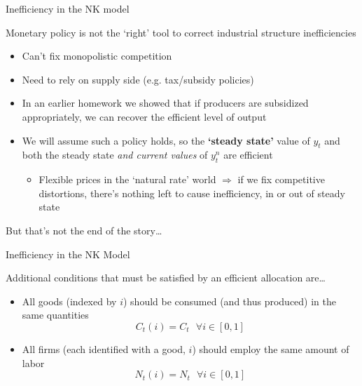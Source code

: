 \begin{frame}[label=efficiency]{Inefficiency in the NK model}

Monetary policy is not the `right' tool to correct industrial structure inefficiencies
\begin{itemize}
\item	Can't fix monopolistic competition
\item	Need to rely on supply side (e.g. tax/subsidy policies)
\item	In an earlier homework we showed that if producers are subsidized appropriately, we can recover the efficient level of output \hyperlink{efficiency_escape}{}
\item	We will assume such a policy holds, so the \textbf{`steady state'} value of $y_{t}$ and both the steady state \textit{and current values} of $y^{n}_{t}$ are efficient
	\begin{itemize}
	\item	Flexible prices in the `natural rate' world $\Rightarrow$ if we fix competitive distortions, there's nothing left to cause inefficiency, in or out of steady state
	\end{itemize}
\end{itemize}

\vspace{2mm}
But that's not the end of the story\ldots

\end{frame}


	
\begin{frame}{Inefficiency in the NK Model}

Additional conditions that must be satisfied by an efficient allocation are\ldots

\vspace{2mm}
\begin{itemize}
\item	All goods (indexed by $i$) should be consumed (and thus produced) in the same quantities
\[
C_{t}(i) = C_{t}\text{  } \forall i \in [0,1]
\]

\item	All firms (each identified with a good, $i$) should employ the same amount of labor
\[
N_{t}(i) = N_{t}\text{  } \forall i \in [0,1]
\]

\end{itemize}

\end{frame}


